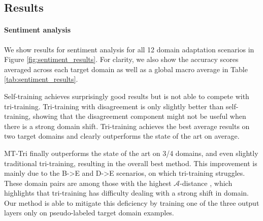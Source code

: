 \documentclass[11pt,a4paper]{article}
\begin{document}
\subsection{Results} \label{sec:results}

\paragraph{Sentiment analysis} We show results for sentiment analysis for all 12 domain adaptation scenarios in Figure \ref{fig:sentiment_results}. For clarity, we also show the accuracy scores averaged across each target domain as well as a global macro average in Table \ref{tab:sentiment_results}.
\begin{table}[ht!]
\centering
{}
\caption{Average accuracy scores for each SA target domain. *: result from .}
\label{tab:sentiment_results}
\end{table}




Self-training achieves surprisingly good results but is not able to compete with tri-training. Tri-training with disagreement is only slightly better than self-training, showing that the disagreement component might not be useful when there is a strong domain shift.
Tri-training achieves the best average results on two target domains and clearly outperforms the state of the art on average.

MT-Tri finally outperforms the state of the art on 3/4 domains, and even slightly traditional tri-training, resulting in the overall best method. This improvement is mainly due to the B->E and D->E scenarios, on which tri-training struggles. These domain pairs are among those with the highest $\mathcal{A}$-distance \cite{Blitzer2007}, which highlights that tri-training has difficulty dealing with a strong shift in domain. Our method is able to mitigate this deficiency by training one of the three output layers only on pseudo-labeled target domain examples.
\end{document}
